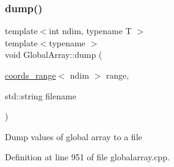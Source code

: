 \subsubsection{\texorpdfstring{dump()}{dump()}}
{\footnotesize\ttfamily template$<$int ndim, typename T $>$ \\
template$<$typename $>$ \\
void Global\+Array\+::dump (\begin{DoxyParamCaption}\item[{\hyperlink{structshark_1_1ndim_1_1coords__range}{coords\+\_\+range}$<$ ndim $>$}]{range,  }\item[{std\+::string}]{filename }\end{DoxyParamCaption})}

Dump values of global array to a file 

Definition at line 951 of file globalarray.\+cpp.


